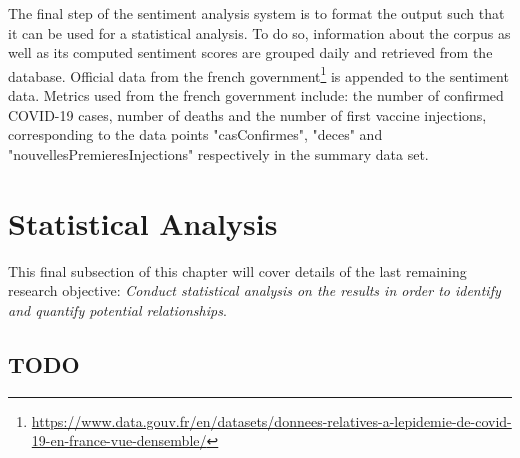 The final step of the sentiment analysis system is to format the output such that it can be used for a statistical analysis. To do so, information about the corpus as well as its computed sentiment scores are grouped daily and retrieved from the database. Official data from the french government\footnote{\url{https://www.data.gouv.fr/en/datasets/donnees-relatives-a-lepidemie-de-covid-19-en-france-vue-densemble/}} is appended to the sentiment data. Metrics used from the french government include: the number of confirmed COVID-19 cases, number of deaths and the number of first vaccine injections, corresponding to the data points "casConfirmes", "deces" and "nouvellesPremieresInjections" respectively in the summary data set.

\section{Statistical Analysis}

This final subsection of this chapter will cover details of the last remaining research objective: \emph{Conduct statistical analysis on the results in order to identify and quantify potential relationships}.

\subsection{TODO}